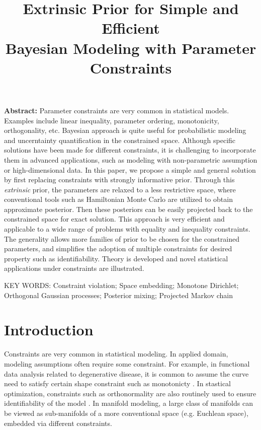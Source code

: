 \documentclass[10pt]{article}
\title{\textbf{Extrinsic Prior for Simple and Efficient\\ Bayesian Modeling with Parameter Constraints}}
\date{}
\begin{document}
\maketitle


{\bf Abstract:} Parameter constraints are very common in statistical models. Examples include linear inequality, parameter ordering, monotonicity, orthogonality, etc. Bayesian approach is quite useful for probabilistic modeling and uncerntainty quantification in the constrained space. Although specific solutions have been made for different constraints, it is challenging to incorporate them in advanced applications, such as modeling with non-parametric assumption or high-dimensional data. In this paper, we propose a simple and general solution by first replacing constraints with strongly informative prior. Through this {\it extrinsic} prior, the parameters are relaxed to a less restrictive space, where conventional tools such as Hamiltonian Monte Carlo are utilized to obtain approximate posterior. Then these posteriors can be easily projected back to the constrained space for exact solution. This approach is very efficient and applicable to a wide range of problems with equality and inequality constraints. The generality allows more families of prior to be chosen for the constrained parameters, and simplifies the adoption of multiple constraints for desired property such as identifiability. Theory is developed and novel statistical applications under constraints are illustrated.
\vskip 12pt

{\noindent  KEY WORDS:  Constraint violation; Space embedding; Monotone Dirichlet; Orthogonal Gaussian processes; Posterior mixing; Projected Markov chain}
{}

\section{Introduction}

Constraints are very common in statistical modeling. In applied domain, modeling assumptions often require some constraint. For example, in functional data analysis related to degenerative disease, it is common to assume the curve need to satisfy certain shape constraint such as monotonicty \citep{lin2014monogp}. In stastical optimization, constraints such as orthonormality are also routinely used to ensure identifiability of the model \citep{uschmajew2010well}. In manifold modeling, a large class of manifolds can be viewed as sub-manifolds of a more conventional space (e.g. Euchlean space), embedded via different constraints.
\end{document}
